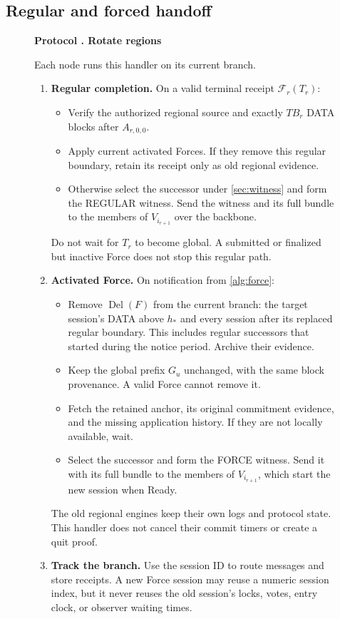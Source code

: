 \documentclass[11pt,a4paper]{article}
\newif\ifrevmarks
\newcommand{\Rv}[1]{\ifrevmarks\leavevmode{\color{rvBlue}#1}\else#1\fi}
\newcommand{\Cid}[1]{\ifrevmarks\textsuperscript{\hyperlink{chg:#1}{\color{rvBlue}\sffamily\scriptsize#1}}\fi}
\newcommand{\FC}{\mathcal F}
\newcommand{\Del}{\operatorname{Del}}
\newcommand{\TB}{\mathit{TB}}
\newcounter{protocol}
\newenvironment{protocol}[2]{\begin{figure}[htbp]\refstepcounter{protocol}\label{#1}
\begin{mdframed}[linewidth=.6pt,skipabove=0pt,skipbelow=0pt,
innertopmargin=7pt,innerbottommargin=7pt]\small
\textbf{Protocol \theprotocol. #2}\par\smallskip}{\end{mdframed}\end{figure}}
\begin{document}
\subsection{Regular and forced handoff}
\begin{protocol}{alg:rotation}{Rotate regions}
Each node runs this handler on \Rv{its current branch}.
\begin{enumerate}[label=\textbf{\arabic*)},itemsep=3pt]
\item \textbf{Regular completion.} On a valid terminal receipt
$\FC_r(T_r)$:
\begin{itemize}
\item Verify the authorized regional source and exactly $\TB_r$ DATA
blocks after $A_{r,0,0}$.
\item Apply current activated Forces. If they remove this regular
boundary, retain its receipt only as old regional evidence.
\item Otherwise select the successor under \cref{sec:witness} and
form the REGULAR witness. \Rv{Send the witness and its full
bundle to the members of $V_{i_{r+1}}$ over the backbone.}
\end{itemize}
Do not wait for $T_r$ to become global. A submitted or finalized but
inactive Force does not stop this regular path.

\item \textbf{Activated Force.} On notification from \cref{alg:force}:
\begin{itemize}
\item \Rv{Remove $\Del(F)$ from the current branch: the target
session's DATA above $h_*$ and every session after its replaced regular
boundary.} This includes regular successors that started during the notice period.
\Rv{Archive their evidence.}
\item \Rv{Keep the global prefix $G_u$ unchanged, with the same
block provenance.} A valid Force cannot remove it.
\item Fetch the retained anchor, its original commitment evidence, and the missing
application history. If they are not locally available, wait.
\item Select the successor and form the FORCE witness. \Rv{Send
it with its full bundle to the members of $V_{i_{r+1}}$, which start the
new session when Ready.}
\end{itemize}
The old regional engines keep their own logs and protocol state. This
handler does not cancel their commit timers or create a quit proof.

\item \textbf{Track the branch.} Use the \Rv{session ID} to route
messages and store receipts. A new Force \Rv{session} may reuse a numeric
session index, but it never reuses the old \Rv{session}'s locks, votes,
entry clock, or observer waiting times.
\end{enumerate}
\end{protocol}
\end{document}
